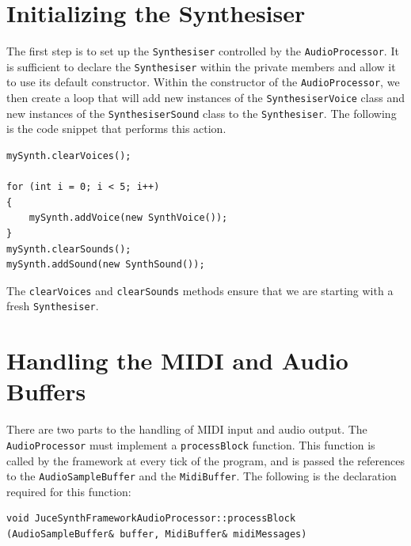 \documentclass[a4paper,12pt]{report}
\begin{document}
\section{Initializing the Synthesiser}
\label{sec:initializesynthesizer}
The first step is to set up the \texttt{Synthesiser} controlled by the \texttt{AudioProcessor}. It is sufficient to declare the \texttt{Synthesiser} within the private members and allow it to use its default constructor. 
Within the constructor of the \texttt{AudioProcessor}, we then create a loop that will add new instances of the \texttt{SynthesiserVoice} class and new instances of the \texttt{SynthesiserSound} class to the \texttt{Synthesiser}. The following is the code snippet that performs this action.

 \noindent\begin{minipage}{\linewidth} \begin{lstlisting}[caption={Instantiating Voices},label={code:instantiatingvoices},captionpos=b]
mySynth.clearVoices();
    
for (int i = 0; i < 5; i++)
{
    mySynth.addVoice(new SynthVoice());
}
mySynth.clearSounds();
mySynth.addSound(new SynthSound());
\end{lstlisting}
\end{minipage}

The \texttt{clearVoices} and \texttt{clearSounds} methods ensure that we are starting with a fresh \texttt{Synthesiser}.

\section{Handling the MIDI and Audio Buffers}
\label{sec:handlingbuffers}
There are two parts to the handling of MIDI input and audio output. The \texttt{AudioProcessor} must implement a \texttt{processBlock} function. This function is called by the framework at every tick of the program, and is passed the references to the \texttt{AudioSampleBuffer} and the \texttt{MidiBuffer}. The following is the declaration required for this function:

 \noindent\begin{minipage}{\linewidth} \begin{lstlisting}[caption={processBlock Declaration},label={code:processblockdeclaration},captionpos=b]
void JuceSynthFrameworkAudioProcessor::processBlock (AudioSampleBuffer& buffer, MidiBuffer& midiMessages)
\end{lstlisting} \end{minipage}
\end{document}
